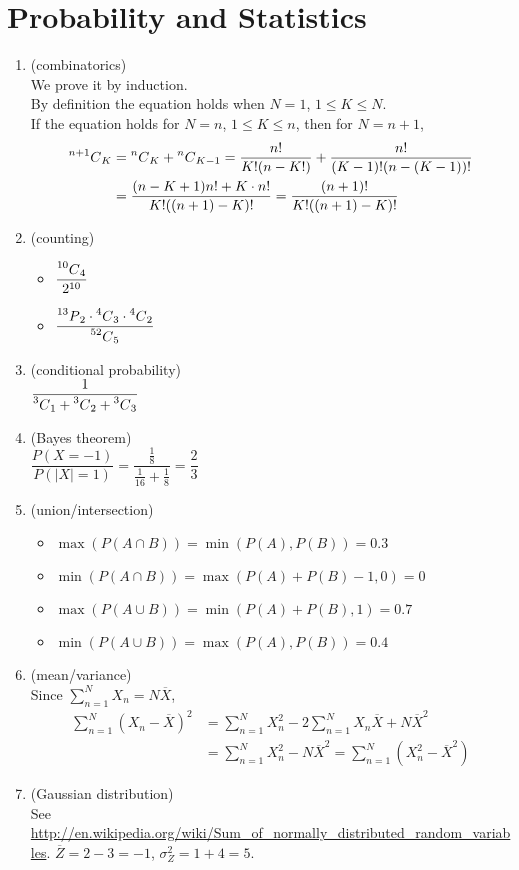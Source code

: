\newcommand{\mlComb}[2]{\prescript{#1}{}{C}_{#2}}
\newcommand{\mlPerm}[2]{\prescript{#1}{}{P}_{#2}}

\section{Probability and Statistics}
\begin{enumerate}[(1)]
	\item (combinatorics) \\
		We prove it by induction. \\
		By definition the equation holds when $N=1$, $1\leq K \leq N$. \\
		If the equation holds for $N = n$, $1 \leq K \leq n$, then for $N = n+1$, \\
		\begin{align*}
			\mlComb{n+1}{K} &= \mlComb{n}{K} + \mlComb{n}{K-1} = \frac{n!}{K!(n-K!)} + \frac{n!}{(K-1)!(n-(K-1))!} \\
					&= \frac{(n-K+1)n! + K\cdot n!}{K!((n+1)-K)!} = \frac{(n+1)!}{K!((n+1)-K)!}
		\end{align*}
	\item (counting)
	\begin{itemize}
		\item $\dfrac{\mlComb{10}{4}}{2^{10}}$
		\item $\dfrac{\mlPerm{13}{2}\cdot \mlComb{4}{3}\cdot \mlComb{4}{2}}{\mlComb{52}{5}}$
	\end{itemize}
	\item (conditional probability) \\
		$\dfrac{1}{\mlComb{3}{1} + \mlComb{3}{2} + \mlComb{3}{3}}$
	\item (Bayes theorem) \\
		$\dfrac{P(X=-1)}{P(|X|=1)} = \dfrac{\frac{1}{8}}{\frac{1}{16} + \frac{1}{8}} = \dfrac{2}{3}$
	\item (union/intersection)
	\begin{itemize}
		\item $\max(P(A\cap B)) = \min(P(A), P(B)) = 0.3$
		\item $\min(P(A\cap B)) = \max(P(A) + P(B) - 1, 0) = 0$
		\item $\max(P(A\cup B)) = \min(P(A) + P(B), 1) = 0.7$
		\item $\min(P(A\cup B)) = \max(P(A), P(B)) = 0.4$
	\end{itemize}
	\item (mean/variance) \\
		Since $\sum^N_{n=1}X_n = N\overline{X}$,
		\begin{align*}
			\sum^N_{n=1}(X_n-\overline{X})^2 &= \sum^N_{n=1}X_n^2 - 2\sum^N_{n=1}X_n\overline{X} + N\overline{X}^2 \\
				&= \sum^N_{n=1}X_n^2 - N\overline{X}^2 = \sum^N_{n=1}(X_n^2 - \overline{X}^2)
		\end{align*}
	\item (Gaussian distribution) \\
		See \url{http://en.wikipedia.org/wiki/Sum_of_normally_distributed_random_variables}.
		$\overline{Z} = 2 - 3 = -1$, $\sigma^2_{Z} = 1 + 4 = 5$.
\end{enumerate}
